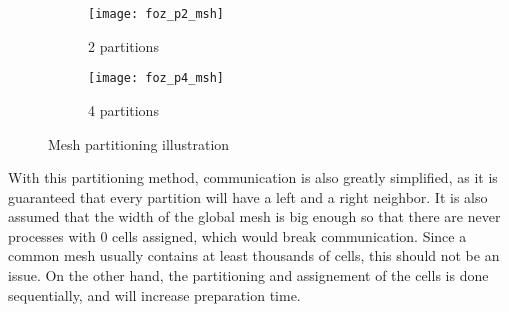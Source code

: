 \begin{figure}[!htp]
	\begin{subfigure}[b]{0.5\columnwidth}
		\centering
		\texttt{[image: foz\_p2\_msh]}
		\caption{2 partitions}
		\label{fig:foz_p2_msh}
	\end{subfigure}%
	\begin{subfigure}[b]{0.5\columnwidth}
		\centering
		\texttt{[image: foz\_p4\_msh]}
		\caption{4 partitions}
		\label{fig:foz_p4_msh}
	\end{subfigure}%

	\caption{Mesh partitioning illustration}
	\label{fig:partitioning}
\end{figure}

With this partitioning method, communication is also greatly simplified, as it is guaranteed that every partition will have a left and a right neighbor. It is also assumed that the width of the global mesh is big enough so that there are never processes with 0 cells assigned, which would break communication. Since a common mesh usually contains at least thousands of cells, this should not be an issue.
On the other hand, the partitioning and assignement of the cells is done sequentially, and will increase preparation time.

